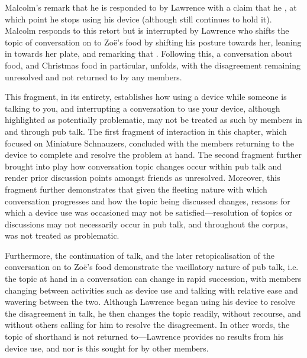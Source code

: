 \begin{revisedsubmission}
Malcolm's remark that he  is responded to by Lawrence with a claim that he , at which point he stops using his device (although still continues to hold it).
Malcolm responds to this retort but is interrupted by Lawrence who shifts the topic of conversation on to Zo\"{e}’s food by shifting his posture towards her, leaning in towards her plate, and remarking that .
Following this, a conversation about food, and Christmas food in particular, unfolds, with the disagreement remaining unresolved and not returned to by any members.


This fragment, in its entirety, establishes how using a device while someone is talking to you, and interrupting a conversation to use your device, although highlighted as potentially problematic, may not be treated as such by members in and through pub talk.
The first fragment of interaction in this chapter, which focused on Miniature Schnauzers, concluded with the members returning to the device to complete and resolve the problem at hand.
The second fragment further brought into play how conversation topic changes occur within pub talk and render prior discussion points amongst friends as unresolved.
Moreover, this fragment further demonstrates that given the fleeting nature with which conversation progresses and how the topic being discussed changes, reasons for which a device use was occasioned may not be satisfied---resolution of topics or discussions may not necessarily occur in pub talk, and throughout the corpus, was not treated as problematic.

Furthermore, the continuation of talk, and the later retopicalisation of the conversation on to Zo\"{e}'s food demonstrate the vacillatory nature of pub talk, i.e. the topic at hand in a conversation can change in rapid succession, with members changing between activities such as device use and talking with relative ease and wavering between the two.
Although Lawrence began using his device to resolve the disagreement in talk, he then changes the topic readily, without recourse, and without others calling for him to resolve the disagreement.
In other words, the topic of shorthand is not returned to---Lawrence provides no results from his device use, and nor is this sought for by other members.
\end{revisedsubmission}



